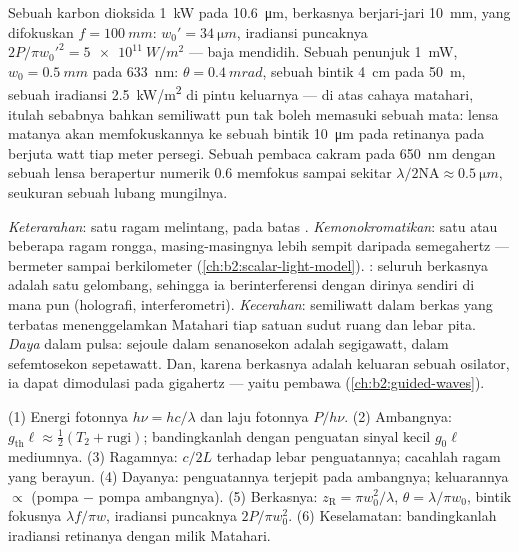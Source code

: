 \begin{example}\label{ex:b2:laser:focus}
Sebuah  karbon dioksida \qty{1}{kW} pada \qty{10.6}{\micro m}, berkasnya berjari-jari
\qty{10}{mm}, yang difokuskan $f = \qty{100}{mm}$: $w_0' = \qty{34}{\micro m}$,
iradiansi puncaknya $2P/\pi w_0'^2 = \qty{5e11}{W/m^2}$ --- baja mendidih.
Sebuah penunjuk \qty{1}{mW}, $w_0 = \qty{0.5}{mm}$ pada \qty{633}{nm}: $\theta =
\qty{0.4}{mrad}$, sebuah bintik \qty{4}{cm} pada \qty{50}{m}, sebuah iradiansi
\qty{2.5}{kW/m^2} di pintu keluarnya --- di atas cahaya matahari, itulah sebabnya bahkan
semiliwatt pun tak boleh memasuki sebuah mata: lensa matanya akan memfokuskannya ke sebuah
bintik \qty{10}{\micro m} pada retinanya pada berjuta watt tiap meter
persegi. Sebuah pembaca cakram pada \qty{650}{nm} dengan sebuah lensa berapertur numerik
$0.6$ memfokus sampai sekitar $\lambda/2\mathrm{NA} \approx \qty{0.5}{\micro m}$,
seukuran sebuah lubang mungilnya.
\end{example}

\begin{remark}\label{rem:b2:laser:special}
\emph{Keterarahan}: satu ragam melintang,  pada batas
. \emph{Kemonokromatikan}: satu atau beberapa ragam rongga, masing-masingnya
lebih sempit daripada semegahertz ---  bermeter sampai berkilometer
(\cref{ch:b2:scalar-light-model}). \emph{}: seluruh
berkasnya adalah satu gelombang, sehingga ia berinterferensi dengan dirinya sendiri di mana pun (holografi,
interferometri). \emph{Kecerahan}: semiliwatt dalam berkas yang terbatas 
menenggelamkan Matahari tiap satuan sudut ruang dan lebar pita. \emph{Daya}
dalam pulsa: sejoule dalam senanosekon adalah segigawatt, dalam sefemtosekon
sepetawatt. Dan, karena berkasnya adalah keluaran sebuah osilator, ia dapat
dimodulasi pada gigahertz --- yaitu pembawa 
(\cref{ch:b2:guided-waves}).
\end{remark}

\begin{method}\label{meth:b2:laser:method}
(1) Energi fotonnya $h\nu = hc/\lambda$ dan laju fotonnya $P/h\nu$.
(2) Ambangnya: $g_{\text{th}}\ell \approx \tfrac12(T_2 + \text{rugi})$;
bandingkanlah dengan penguatan sinyal kecil $g_0\ell$ mediumnya.
(3) Ragamnya: $c/2L$ terhadap lebar penguatannya; cacahlah ragam yang berayun.
(4) Dayanya: penguatannya terjepit pada ambangnya; keluarannya $\propto$ (pompa $-$
pompa ambangnya). (5) Berkasnya: $z_{\text{R}} = \pi w_0^2/\lambda$, $\theta =
\lambda/\pi w_0$, bintik fokusnya $\lambda f/\pi w$, iradiansi puncaknya
$2P/\pi w_0^2$. (6) Keselamatan: bandingkanlah iradiansi retinanya dengan
milik Matahari.
\end{method}

